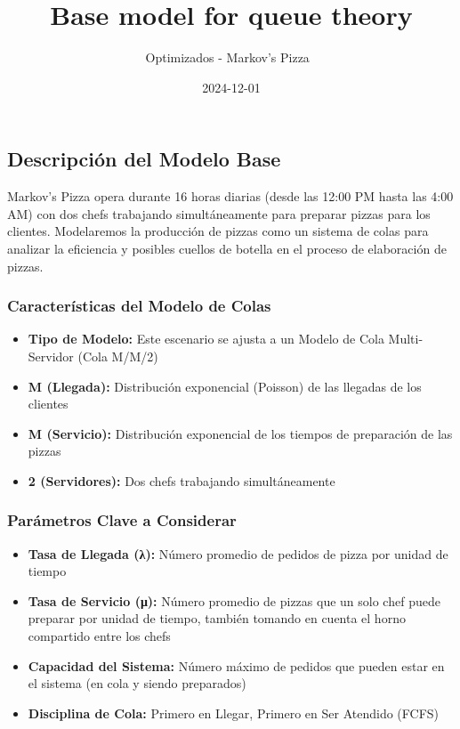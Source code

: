 \documentclass[
]{article}
\title{Base model for queue theory}
\author{Optimizados - Markov's Pizza 🍕}
\date{2024-12-01}
\providecommand{\tightlist}{%
  \setlength{\itemsep}{0pt}\setlength{\parskip}{0pt}}
\begin{document}
\maketitle

\subsection{Descripción del Modelo
Base}\label{descripciuxf3n-del-modelo-base}

Markov's Pizza opera durante 16 horas diarias (desde las 12:00 PM hasta
las 4:00 AM) con dos chefs trabajando simultáneamente para preparar
pizzas para los clientes. Modelaremos la producción de pizzas como un
sistema de colas para analizar la eficiencia y posibles cuellos de
botella en el proceso de elaboración de pizzas.

\subsubsection{Características del Modelo de
Colas}\label{caracteruxedsticas-del-modelo-de-colas}

\begin{itemize}
\tightlist
\item
  \textbf{Tipo de Modelo:} Este escenario se ajusta a un Modelo de Cola
  Multi-Servidor (Cola M/M/2)
\item
  \textbf{M (Llegada):} Distribución exponencial (Poisson) de las
  llegadas de los clientes
\item
  \textbf{M (Servicio):} Distribución exponencial de los tiempos de
  preparación de las pizzas
\item
  \textbf{2 (Servidores):} Dos chefs trabajando simultáneamente
\end{itemize}

\subsubsection{Parámetros Clave a
Considerar}\label{paruxe1metros-clave-a-considerar}

\begin{itemize}
\tightlist
\item
  \textbf{Tasa de Llegada (λ):} Número promedio de pedidos de pizza por
  unidad de tiempo
\item
  \textbf{Tasa de Servicio (μ):} Número promedio de pizzas que un solo
  chef puede preparar por unidad de tiempo, también tomando en cuenta el
  horno compartido entre los chefs
\item
  \textbf{Capacidad del Sistema:} Número máximo de pedidos que pueden
  estar en el sistema (en cola y siendo preparados)
\item
  \textbf{Disciplina de Cola:} Primero en Llegar, Primero en Ser
  Atendido (FCFS)
\end{itemize}
\end{document}
